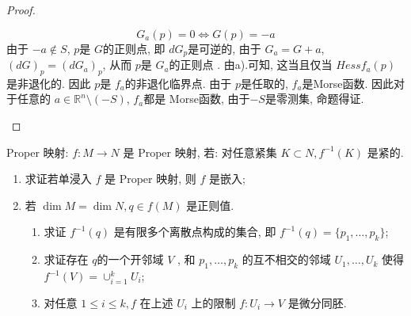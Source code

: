 \documentclass[../main.tex]{subfiles}
\begin{document}
\begin{proof}
\begin{enumerate}
\[         G_{a}\left( p \right)= 0\iff G\left( p \right)= -a   
        \]    由于 \(  -a \not \in S  \), \(  p  \)是 \(  G  \)的正则点, 即 \(  dG_{p}  \)是可逆的,  由于 \( G_{a}= G+ a \), \(  \left( dG \right)_{p} = \left(  dG_{a} \right)_{p}     \), 从而 \(  p  \)是 \(G_{a}  \)的正则点  . 由a).可知, 这当且仅当 \(  Hess f_{a}\left( p \right)   \)是非退化的. 因此 \(  p  \)是 \(  f_{a}  \)的非退化临界点. 由于 \(  p  \)是任取的,  \(  f_{a}  \)是Morse函数. 因此对于任意的 \(  a \in \mathbb{R} ^{n}\setminus \left( -S \right)   \), \(  f_{a}  \)都是 Morse函数, 由于\(  -S  \)是零测集, 命题得证.       
    \end{enumerate}
    
\end{proof}
\begin{exercise}{}{}
Proper 映射: $f: M \to N$ 是 Proper 映射, 若: 对任意紧集 $K \subset N, f^{-1}(K)$ 是紧的.
\begin{enumerate}
    \item[a).] 求证若单浸入 $f$ 是 Proper 映射, 则 $f$ 是嵌入;
    \item[b).] 若 $\dim M = \dim N, q \in f(M)$ 是正则值.
    \begin{enumerate}
        \item[1).] 求证 $f^{-1}(q)$ 是有限多个离散点构成的集合, 即 $f^{-1}(q) = \{p_1, \dots, p_k\}$;
        \item[2).] 求证存在 \(  q  \)的一个开邻域 \(  V  \) , 和 $p_1, \dots, p_k$ 的互不相交的邻域 $U_1, \dots, U_k$ 使得 $f^{-1}(V) = \cup_{i=1}^k U_i$;
        \item[3).] 对任意 $1 \le i \le k, f$ 在上述 $U_i$ 上的限制 $f: U_i \to V$ 是微分同胚.
    \end{enumerate}
\end{enumerate}
\end{exercise}
\end{document}
